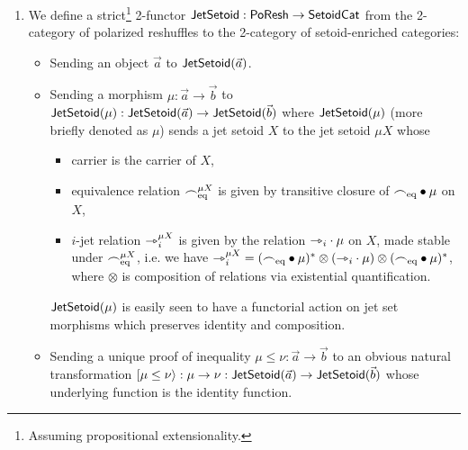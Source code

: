 \documentclass[a4paper]{memoir}
\begin{document}
\begin{definition}
	\label{def:poresh-jetsetoid}
	\label{def:poresh-jetset}
	\begin{enumerate}
		\item We define a strict\footnote{Assuming propositional extensionality.} 2-functor $\mathsf{JetSetoid} : \mathsf{PoResh} \to {\mathsf{Setoid}}{\mathsf{Cat}}$ from the 2-category of polarized reshuffles to the 2-category of setoid-enriched categories:
		\begin{itemize}
			\item Sending an object $\vec a$ to $\mathsf{JetSetoid}(\vec a)$.
			\item Sending a morphism $\mu : \vec a \to \vec b$ to $\mathsf{JetSetoid}(\mu) : \mathsf{JetSetoid}(\vec a) \to \mathsf{JetSetoid}(\vec b)$ where $\mathsf{JetSetoid}(\mu)$ (more briefly denoted as $\mu$) sends a jet setoid $X$ to the jet setoid $\mu X$ whose
			\begin{itemize}
				\item carrier is the carrier of $X$,
				\item equivalence relation ${\frown}_{{\mathrm{eq}}}^{\mu X}$ is given by transitive closure of ${\frown}_{{\mathrm{eq}}} \mathbin{\bullet} \mu$ on $X$,
				\item $i$-jet relation ${\rightarrowtriangle}_i^{\mu X}$ is given by the relation ${\rightarrowtriangle}_i \cdot \mu$ on $X$, made stable under ${\frown}_{{\mathrm{eq}}}^{\mu X}$, i.e. we have
				${\rightarrowtriangle}_i^{\mu X} = ({\frown}_{{\mathrm{eq}}} \mathbin{\bullet} \mu)^* \otimes ({\rightarrowtriangle}_i \cdot \mu) \otimes ({\frown}_{{\mathrm{eq}}} \mathbin{\bullet} \mu)^*$, where $\otimes$ is composition of relations via existential quantification.
			\end{itemize}
			$\mathsf{JetSetoid}(\mu)$ is easily seen to have a functorial action on jet set morphisms which preserves identity and composition.
			\item Sending a unique proof of inequality $\mu \leq \nu : \vec a \to \vec b$ to an obvious natural transformation $\mathopen{}\left[ \mu \leq \nu \right\rangle\mathclose{} : \mu \to \nu : \mathsf{JetSetoid}(\vec a) \to \mathsf{JetSetoid}(\vec b)$ whose underlying function is the identity function.
		\end{itemize}
		

\end{enumerate}
\end{definition}
\end{document}
